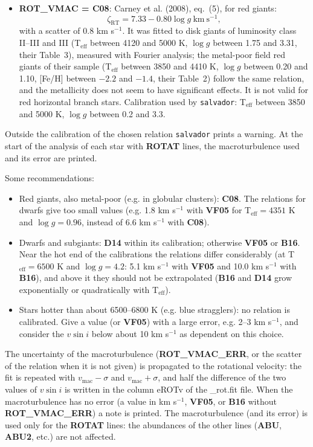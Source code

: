\documentclass[modern]{aastex701}
\begin{document}
\begin{itemize}
    \item {\bf ROT\_VMAC = C08}: Carney et al. (2008), eq.~(5), for red giants:
    \begin{equation}
        \zeta_{\mathrm{RT}} = 7.33 - 0.80 \log g~\mathrm{km~s^{-1}},
    \end{equation}
    with a scatter of 0.8 km s$^{-1}$. It was fitted to disk giants of luminosity class II--III and III (T$_{\mathrm{eff}}$ between 4120 and 5000 K, $\log g$ between 1.75 and 3.31, their Table~3), measured with Fourier analysis; the metal-poor field red giants of their sample (T$_{\mathrm{eff}}$ between 3850 and 4410 K, $\log g$ between 0.20 and 1.10, [Fe/H] between $-2.2$ and $-1.4$, their Table~2) follow the same relation, and the metallicity does not seem to have significant effects. It is not valid for red horizontal branch stars. Calibration used by \texttt{salvador}: T$_{\mathrm{eff}}$ between 3850 and 5000 K, $\log g$ between 0.2 and 3.3.
\end{itemize}
Outside the calibration of the chosen relation \texttt{salvador} prints a warning. At the start of the analysis of each star with {\bf ROTAT} lines, the macroturbulence used and its error are printed.

Some recommendations:
\begin{itemize}
    \item Red giants, also metal-poor (e.g. in globular clusters): {\bf C08}. The relations for dwarfs give too small values (e.g. 1.8 km s$^{-1}$ with {\bf VF05} for T$_{\mathrm{eff}} = 4351$ K and $\log g = 0.96$, instead of 6.6 km s$^{-1}$ with {\bf C08}).
    \item Dwarfs and subgiants: {\bf D14} within its calibration; otherwise {\bf VF05} or {\bf B16}. Near the hot end of the calibrations the relations differ considerably (at T$_{\mathrm{eff}} = 6500$ K and $\log g = 4.2$: 5.1 km s$^{-1}$ with {\bf VF05} and 10.0 km s$^{-1}$ with {\bf B16}), and above it they should not be extrapolated ({\bf B16} and {\bf D14} grow exponentially or quadratically with T$_{\mathrm{eff}}$).
    \item Stars hotter than about 6500--6800 K (e.g. blue stragglers): no relation is calibrated. Give a value (or {\bf VF05}) with a large error, e.g. 2--3 km s$^{-1}$, and consider the $v \sin i$ below about 10 km s$^{-1}$ as dependent on this choice.
\end{itemize}

The uncertainty of the macroturbulence ({\bf ROT\_VMAC\_ERR}, or the scatter of the relation when it is not given) is propagated to the rotational velocity: the fit is repeated with $v_{\mathrm{mac}} - \sigma$ and $v_{\mathrm{mac}} + \sigma$, and half the difference of the two values of $v \sin i$ is written in the column eROTv of the \_rot.fit file. When the macroturbulence has no error (a value in km s$^{-1}$, {\bf VF05}, or {\bf B16} without {\bf ROT\_VMAC\_ERR}) a note is printed. The macroturbulence (and its error) is used only for the {\bf ROTAT} lines: the abundances of the other lines ({\bf ABU}, {\bf ABU2}, etc.) are not affected.
\end{document}
